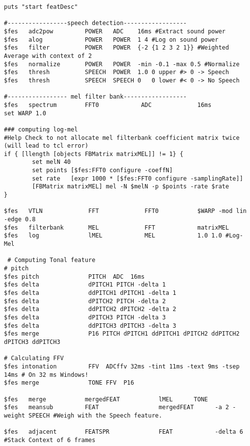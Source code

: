 \begin{lstlisting}[label=lst:features,caption=The feature description as used by our pre-DBNF-preprocessing]
puts "start featDesc"

#-----------------speech detection------------------
$fes   adc2pow         POWER   ADC    16ms #Extract sound power
$fes   alog            POWER   POWER  1 4 #Log on sound power
$fes   filter          POWER   POWER  {-2 {1 2 3 2 1}} #Weighted Average with context of 2
$fes   normalize       POWER   POWER  -min -0.1 -max 0.5 #Normalize
$fes   thresh          SPEECH  POWER  1.0 0 upper #> 0 -> Speech
$fes   thresh          SPEECH  SPEECH 0   0 lower #< 0 -> No Speech

#----------------- mel filter bank------------------
$fes   spectrum        FFT0            ADC             16ms
set WARP 1.0
        
### computing log-mel
#Help Check to not allocate mel filterbank coefficient matrix twice (will lead to tcl error)
if { [llength [objects FBMatrix matrixMEL]] != 1} {
        set melN 40
        set points [$fes:FFT0 configure -coeffN]
        set rate   [expr 1000 * [$fes:FFT0 configure -samplingRate]]
        [FBMatrix matrixMEL] mel -N $melN -p $points -rate $rate
}

$fes   VTLN             FFT             FFT0           $WARP -mod lin -edge 0.8
$fes   filterbank       MEL             FFT            matrixMEL
$fes   log              lMEL            MEL            1.0 1.0 #Log-Mel

 # Computing Tonal feature
# pitch
$fes pitch              PITCH  ADC  16ms
$fes delta              dPITCH1 PITCH -delta 1
$fes delta              ddPITCH1 dPITCH1 -delta 1
$fes delta              dPITCH2 PITCH -delta 2
$fes delta              ddPITCH2 dPITCH2 -delta 2
$fes delta              dPITCH3 PITCH -delta 3
$fes delta              ddPITCH3 dPITCH3 -delta 3
$fes merge              P16 PITCH dPITCH1 ddPITCH1 dPITCH2 ddPITCH2 dPITCH3 ddPITCH3

# Calculating FFV
$fes intonation         FFV  ADCffv 32ms -tint 11ms -text 9ms -tsep 14ms # On 32 ms Windows!
$fes merge              TONE FFV  P16

$fes   merge           mergedFEAT           lMEL      TONE
$fes   meansub         FEAT                 mergedFEAT      -a 2 -weight SPEECH #Weigh with the Speech feature.

$fes   adjacent        FEATSPR              FEAT            -delta 6 #Stack Context of 6 frames
\end{lstlisting}

